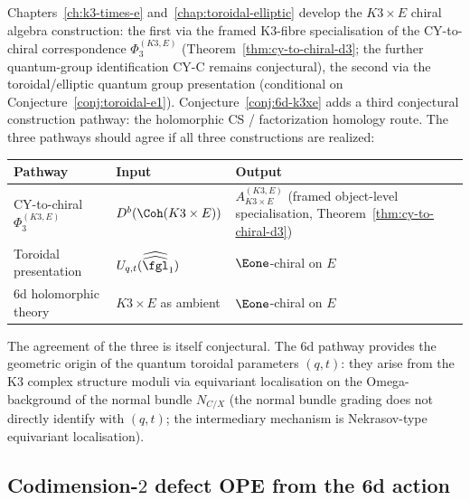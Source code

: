 \begin{remark}
\label{rem:6d-adds-to-k3xe}
Chapters~\ref{ch:k3-times-e} and~\ref{chap:toroidal-elliptic} develop the $K3 \times E$ chiral algebra construction: the first via the framed K3-fibre specialisation of the CY-to-chiral correspondence $\Phi_3^{(K3,E)}$ (Theorem~\ref{thm:cy-to-chiral-d3}; the further quantum-group identification CY-C remains conjectural), the second via the toroidal/elliptic quantum group presentation (conditional on Conjecture~\ref{conj:toroidal-e1}). Conjecture~\ref{conj:6d-k3xe} adds a third conjectural construction pathway: the holomorphic CS / factorization homology route. The three pathways should agree if all three constructions are realized:
\begin{center}
\small
\begin{tabular}{lll}
 \toprule
 \textbf{Pathway} & \textbf{Input} & \textbf{Output} \\
 \midrule
 CY-to-chiral $\Phi_3^{(K3,E)}$ & $D^b(\Coh(K3 \times E))$ & $A_{K3 \times E}^{(K3,E)}$ (framed object-level specialisation, Theorem~\ref{thm:cy-to-chiral-d3}) \\
 Toroidal presentation & $U_{q,t}(\widehat{\widehat{\fgl}}_1)$ & $\Eone$-chiral on $E$ \\
 6d holomorphic theory & $K3 \times E$ as ambient & $\Eone$-chiral on $E$ \\
 \bottomrule
\end{tabular}
\end{center}
The agreement of the three is itself conjectural. The 6d pathway provides the geometric origin of the quantum toroidal parameters $(q, t)$: they arise from the K3 complex structure moduli via equivariant localisation on the Omega-background of the normal bundle $N_{C/X}$ (the normal bundle grading does not directly identify with $(q,t)$; the intermediary mechanism is Nekrasov-type equivariant localisation).
\end{remark}

\subsection{Codimension-\texorpdfstring{$2$}{2} defect OPE from the 6d action}
\label{subsec:codim2-defect-ope}

